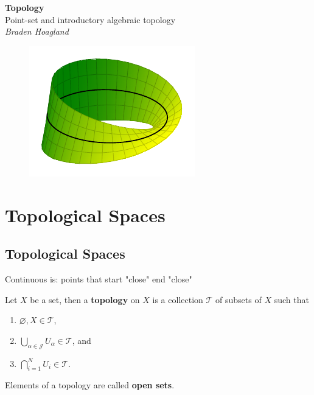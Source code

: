 \documentclass[10pt]{report}
\begin{document}
\begin{titlepage}
	\begin{center}
		{\Huge\textbf{Topology}}\\
		\vspace{4mm}
		Point-set and introductory algebraic topology\\
		\vspace{6mm}
		\textit{Braden Hoagland}
	\end{center}
	\begin{figure}[H]
		\centering
		\includegraphics[scale=2]{fig/hey.pdf}
	\end{figure}
	
\end{titlepage}

\tableofcontents



\chapter{Topological Spaces}


\section{Topological Spaces}

{\color{red}Continuous is: points that start "close" end "close"}


\begin{defn}
	Let $X$ be a set, then a \textbf{topology} on $X$ is a collection $\mathcal{T}$ of subsets of $X$ such that
	\begin{enumerate}
		\item $\varnothing, X \in \mathcal{T}$,
		\item $\bigcup_{\alpha\in \mathcal{J}}U_\alpha \in \mathcal{T}$, and
		\item $\bigcap_{i=1}^N U_i \in \mathcal{T}$.
	\end{enumerate}
	Elements of a topology are called \textbf{open sets}.
\end{defn}
\end{document}
